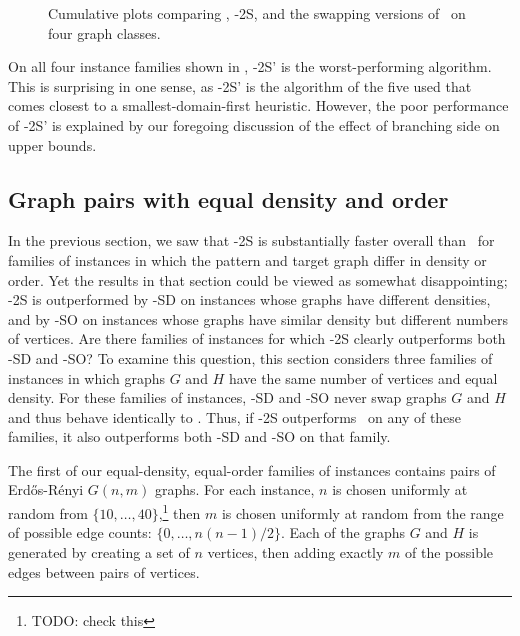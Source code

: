 \begin{figure}[htb]
{        \label{figure:mcsplit2-cumulative-random4}
    }
    \caption{Cumulative plots comparing \McSplit, \McSplit-2S, and the swapping versions of \McSplit\ on four graph classes.}
    \label{figure:mcsplit2-cumulative}
\end{figure}

On all four instance families shown in , \McSplit-2S'
is the worst-performing algorithm.  This is surprising in one sense, as \McSplit-2S' is the algorithm
of the five used that comes closest to a smallest-domain-first heuristic.  However, the poor performance
of \McSplit-2S' is explained by our foregoing discussion of the effect of branching side on upper
bounds.

\subsection{Graph pairs with equal density and order}

In the previous section, we saw that \McSplit-2S is substantially faster overall than \McSplit\ for families
of instances in which the pattern and target graph differ in density or order.  Yet the results in that
section could be viewed as somewhat disappointing; \McSplit-2S is outperformed by \McSplit-SD on instances
whose graphs have different densities, and by \McSplit-SO on instances whose graphs have similar density
but different numbers of vertices.  Are there families of instances for which \McSplit-2S clearly outperforms
both \McSplit-SD and \McSplit-SO?  To examine this question, this section considers three families of instances
in which graphs $G$ and $H$ have the same number of vertices and equal density.  For these families
of instances, \McSplit-SD and \McSplit-SO never swap graphs $G$ and $H$ and thus behave identically to
\McSplit.  Thus, if \McSplit-2S outperforms \McSplit\ on any of these families, it also
outperforms both \McSplit-SD and \McSplit-SO on that family.

The first of our equal-density, equal-order families of instances contains pairs of Erd\H{o}s-Rényi $G(n,m)$ graphs.  For each instance,
$n$ is chosen uniformly at random from $\{10, \dots, 40\}$,\footnote{TODO: check this} then $m$ is chosen
uniformly at random from the range of possible edge counts: $\{0, \dots, n(n-1)/2\}$.  Each of the graphs
$G$ and $H$ is generated by creating a set of $n$ vertices, then adding exactly $m$ of the possible edges
between pairs of vertices.

